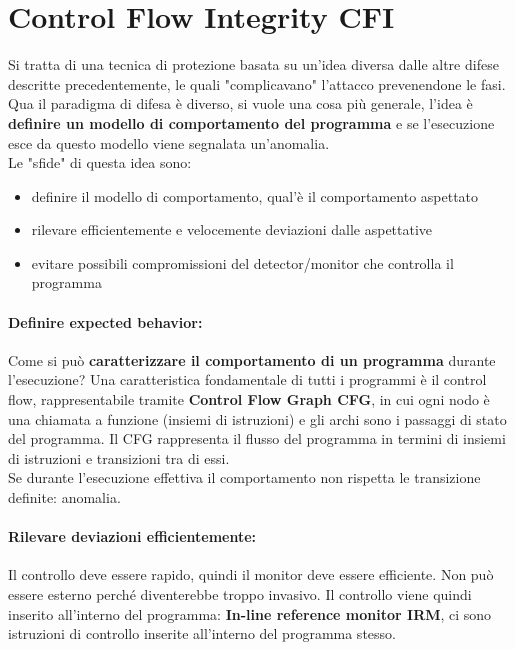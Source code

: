 
\section{Control Flow Integrity CFI}

Si tratta di una tecnica di protezione basata su un'idea diversa dalle altre difese descritte precedentemente, le quali "complicavano" l'attacco prevenendone le fasi. Qua il paradigma di difesa è diverso, si vuole una cosa più generale, l'idea è \textbf{definire un modello di comportamento del programma} e se l'esecuzione esce da questo modello viene segnalata un'anomalia.\\

Le "sfide" di questa idea sono: 
\begin{itemize}
	\item definire il modello di comportamento, qual'è il comportamento aspettato
	\item rilevare efficientemente e velocemente deviazioni dalle aspettative
	\item evitare possibili compromissioni del detector/monitor che controlla il programma
\end{itemize}

\paragraph{Definire expected behavior:} Come si può \textbf{caratterizzare il comportamento di un programma} durante l'esecuzione? Una caratteristica fondamentale di tutti i programmi è il control flow, rappresentabile tramite \textbf{Control Flow Graph CFG}, in cui ogni nodo è una chiamata a funzione (insiemi di istruzioni) e gli archi sono i passaggi di stato del programma. Il CFG rappresenta il flusso del programma in termini di insiemi di istruzioni e transizioni tra di essi. \\

Se durante l'esecuzione effettiva il comportamento non rispetta le transizione definite: anomalia.\\

\paragraph{Rilevare deviazioni efficientemente:} Il controllo deve essere rapido, quindi il monitor deve essere efficiente. Non può essere esterno perché diventerebbe troppo invasivo. Il controllo viene quindi inserito all'interno del programma: \textbf{In-line reference monitor IRM}, ci sono istruzioni di controllo inserite all'interno del programma stesso. \\

